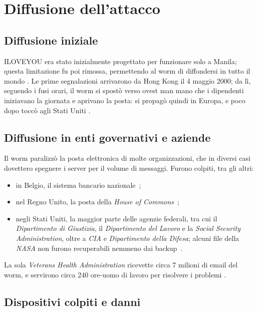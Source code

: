 \section{Diffusione dell'attacco}\label{sec:Diffusione}

\subsection{Diffusione iniziale}\label{subsec:diffusioneIniziale}

ILOVEYOU era stato inizialmente progettato per funzionare solo a Manila; questa limitazione fu poi rimossa, permettendo al worm di diffondersi in tutto il mondo \cite{white2020}. Le prime segnalazioni arrivarono da Hong Kong il 4 maggio 2000; da lì, seguendo i fusi orari, il worm si spostò verso ovest man mano che i dipendenti iniziavano la giornata e aprivano la posta: si propagò quindi in Europa, e poco dopo toccò agli Stati Uniti \cite{gao2000iloveyou,cnn2000}.

\subsection{Diffusione in enti governativi e aziende}

Il worm paralizzò la posta elettronica di molte organizzazioni, che in diversi casi dovettero spegnere i server per il volume di messaggi. Furono colpiti, tra gli altri:

\begin{itemize}
    \item in Belgio, il sistema bancario nazionale~\cite{gao2000iloveyou};
    \item nel Regno Unito, la posta della \textit{House of Commons}~\cite{hansard2000business};
    \item negli Stati Uniti, la maggior parte delle agenzie federali, tra cui il \textit{Dipartimento di Giustizia}, il \textit{Dipartimento del Lavoro} e la \textit{Social Security Administration}, oltre a \textit{CIA} e \textit{Dipartimento della Difesa}; alcuni file della \textit{NASA} non furono recuperabili nemmeno dai backup~\cite{gao2000iloveyou,gao2000rhodes}.
\end{itemize}

La sola \textit{Veterans Health Administration} ricevette circa 7 milioni di email del worm, e servirono circa 240 ore-uomo di lavoro per risolvere i problemi \cite{gao2000iloveyou}.

\subsection{Dispositivi colpiti e danni}

